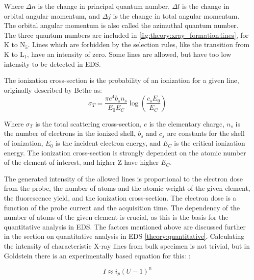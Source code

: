 Where $\Delta n$ is the change in principal quantum number, $\Delta l$ is the change in orbital angular momentum, and $\Delta j$ is the change in total angular momentum.
The orbital angular momentum is also called the azimuthal quantum number.
The three quantum numbers are included in \cref{fig:theory:xray_formation:lines}, for K to N$_5$.
Lines which are forbidden by the selection rules, like the transition from K to L$_1$, have an intensity of zero.
Some lines are allowed, but have too low intensity to be detected in EDS.


The ionization cross-section is the probability of an ionization for a given line, originally described by Bethe \cite{inokuti_on_bethe_1971} as:
\begin{equation}
    \label{eq:ionizationcrosssection}
    \sigma_T = \frac{\pi e^4 b_s n_s}{E_0 E_C}  \log\left(\frac{c_s E_0}{E_C}\right)
\end{equation}

Where $\sigma_T$ is the total scattering cross-section, $e$ is the elementary charge, $n_s$ is the number of electrons in the ionized shell, $b_s$ and $c_s$ are constants for the shell of ionization, $E_0$ is the incident electron energy, and $E_C$ is the critical ionization energy.
The ionization cross-section is strongly dependent on the atomic number of the element of interest, and higher Z have higher $E_C$.


The generated intensity of the allowed lines is proportional to the electron dose from the probe, the number of atoms and the atomic weight of the given element, the fluorescence yield, and the ionization cross-section. %
The electron dose is a function of the probe current and the acquisition time.
The dependency of the number of atoms of the given element is crucial, as this is the basis for the quantitative analysis in EDS.
The factors mentioned above are discussed further in the section on quantitative analysis in EDS \cref{theory:quantitative}.
Calculating the intensity of characteristic X-ray lines from bulk specimen is not trivial, but in Goldstein there is an experimentally based equation for this: \cite[Eq. 4.8]{goldstein_scanning_2018}:

\begin{equation}
    \label{eq:theory:xray_formation:intensity}
    I \approx i_p (U-1)^n
\end{equation}

